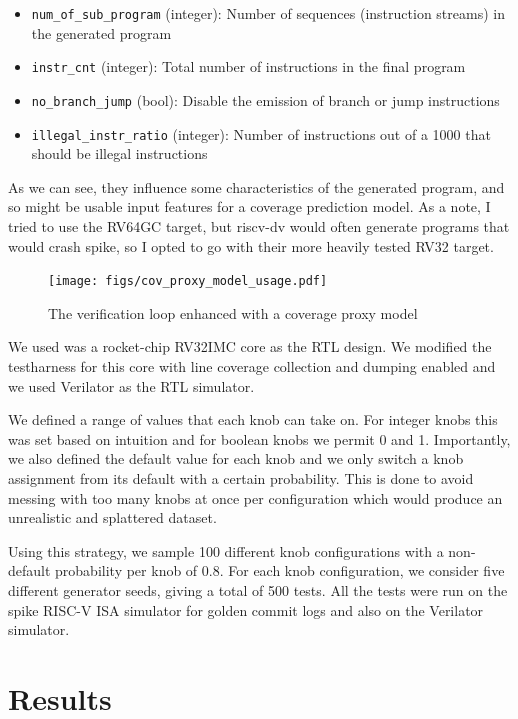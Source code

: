 \documentclass[sigconf,noacm]{acmart}
\begin{document}
\begin{itemize}
  \item \verb|num_of_sub_program| (integer): Number of sequences (instruction streams) in the generated program
  \item \verb|instr_cnt| (integer): Total number of instructions in the final program
  \item \verb|no_branch_jump| (bool): Disable the emission of branch or jump instructions
  \item \verb|illegal_instr_ratio| (integer): Number of instructions out of a 1000 that should be illegal instructions
\end{itemize}

As we can see, they influence some characteristics of the generated program, and so might be usable input features for a coverage prediction model.
As a note, I tried to use the RV64GC target, but riscv-dv would often generate programs that would crash spike, so I opted to go with their more heavily tested RV32 target.

\begin{figure}
  \texttt{[image: figs/cov\_proxy\_model\_usage.pdf]}
  \caption{The verification loop enhanced with a coverage proxy model}
  \label{fig:cov_proxy_model}
\end{figure}

We used was a rocket-chip RV32IMC core as the RTL design.
We modified the testharness for this core with line coverage collection and dumping enabled and we used Verilator as the RTL simulator.

We defined a range of values that each knob can take on.
For integer knobs this was set based on intuition and for boolean knobs we permit 0 and 1.
Importantly, we also defined the default value for each knob and we only switch a knob assignment from its default with a certain probability.
This is done to avoid messing with too many knobs at once per configuration which would produce an unrealistic and splattered dataset.

Using this strategy, we sample 100 different knob configurations with a non-default probability per knob of 0.8.
For each knob configuration, we consider five different generator seeds, giving a total of 500 tests.
All the tests were run on the spike RISC-V ISA simulator for golden commit logs and also on the Verilator simulator.

\section{Results}
\end{document}
